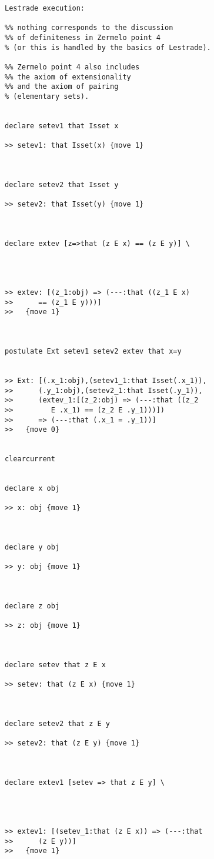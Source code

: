 \documentclass[12pt]{article}
\begin{document}
\begin{verbatim}Lestrade execution:

%% nothing corresponds to the discussion 
%% of definiteness in Zermelo point 4 
% (or this is handled by the basics of Lestrade).

%% Zermelo point 4 also includes
%% the axiom of extensionality
%% and the axiom of pairing
% (elementary sets).


declare setev1 that Isset x

>> setev1: that Isset(x) {move 1}



declare setev2 that Isset y

>> setev2: that Isset(y) {move 1}



declare extev [z=>that (z E x) == (z E y)] \
   



>> extev: [(z_1:obj) => (---:that ((z_1 E x)
>>      == (z_1 E y)))]
>>   {move 1}



postulate Ext setev1 setev2 extev that x=y


>> Ext: [(.x_1:obj),(setev1_1:that Isset(.x_1)),
>>      (.y_1:obj),(setev2_1:that Isset(.y_1)),
>>      (extev_1:[(z_2:obj) => (---:that ((z_2
>>         E .x_1) == (z_2 E .y_1)))])
>>      => (---:that (.x_1 = .y_1))]
>>   {move 0}


clearcurrent


declare x obj

>> x: obj {move 1}



declare y obj

>> y: obj {move 1}



declare z obj

>> z: obj {move 1}



declare setev that z E x

>> setev: that (z E x) {move 1}



declare setev2 that z E y

>> setev2: that (z E y) {move 1}



declare extev1 [setev => that z E y] \
   



>> extev1: [(setev_1:that (z E x)) => (---:that
>>      (z E y))]
>>   {move 1}




\end{verbatim}
\end{document}
